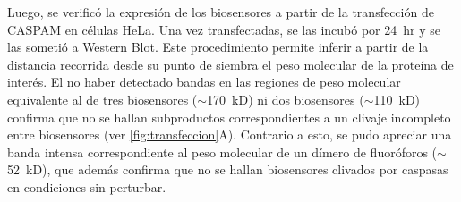 Luego, se verificó la expresión de los biosensores a partir de la transfección de CASPAM en células HeLa. Una vez transfectadas, se las incubó por 24~hr y se las sometió a Western Blot. Este procedimiento permite inferir a partir de la distancia recorrida desde su punto de siembra el peso molecular de la proteína de interés. El no haber detectado bandas en las regiones de peso molecular equivalente al de tres biosensores ($\sim$170~kD) ni dos biosensores ($\sim$110~kD) confirma que no se hallan subproductos correspondientes a un clivaje incompleto entre biosensores (ver \cref{fig:transfeccion}A). Contrario a esto, se pudo apreciar una banda intensa correspondiente al peso molecular de un dímero de fluoróforos ($\sim$52~kD), que además confirma que no se hallan biosensores clivados por caspasas en condiciones sin perturbar.

